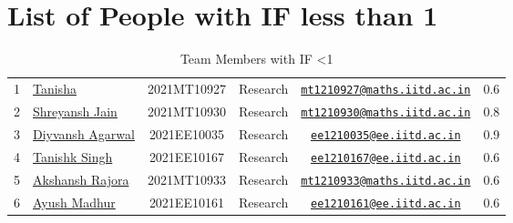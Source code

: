\documentclass[table]{rapportCS}
\begin{document}
\section*{List of People with IF less than 1}\label{sec:IFlessthan1}
\begin{table}[h]
  \caption{Team Members with IF <1}
  \label{tab:team-memberswithiflessthan}
  
  \begin{tabular}{|p{.3cm}|p{3cm}|c|p{2.7cm}|c|c|}
  \hline
1 & \href{https://www.linkedin.com/in/tanisha-jangra-5203132ab}{Tanisha}
& 2021MT10927 & Research  &
\href{mailto:mt1210927@maths.iitd.ac.in}{\nolinkurl{mt1210927@maths.iitd.ac.in}}
& 0.6 \\
2 &
\href{https://www.linkedin.com/in/shreyansh-jain-6abb9124b/}{Shreyansh
Jain} & 2021MT10930 & Research  &
\href{mailto:mt1210930@maths.iitd.ac.in}{\nolinkurl{mt1210930@maths.iitd.ac.in}}
& 0.8 \\
3 & \href{https://www.linkedin.com/in/divyansh-agarwal-22989525b/}{Diyvansh Agarwal} & 2021EE10035 & Research & \href{mailto:ee1210035@ee.iitd.ac.in}{\nolinkurl{ee1210035@ee.iitd.ac.in}} & 0.9 \\
4 & \href{https://www.linkedin.com/in/tanishk-singh-80ba09224/}{Tanishk Singh} & 2021EE10167 & Research & \href{mailto:ee1210167@ee.iitd.ac.in}{\nolinkurl{ee1210167@ee.iitd.ac.in}} & 0.6 \\
5 & \href{https://www.linkedin.com/in/akshansh-rajora-5794b5228}{Akshansh Rajora} & 2021MT10933 & Research & \href{mailto:mt1210933@maths.iitd.ac.in}{\nolinkurl{mt1210933@maths.iitd.ac.in}} & 0.6 \\
6 & \href{https://www.linkedin.com/in/ayush-madhur-40a575236/}{Ayush Madhur} & 2021EE10161 & Research & \href{mailto:ee1210161@ee.iitd.ac.in}{\nolinkurl{ee1210161@ee.iitd.ac.in}} & 0.6 \\


\end{tabular}
\end{table}
\end{document}

